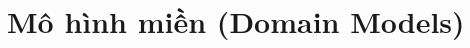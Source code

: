 \documentclass[oneside]{report} %
\begin{document}
% 


% 


% 


% 


% 


% 


% 


% 


% 

\section{Mô hình miền (Domain Models)}


\end{document}
